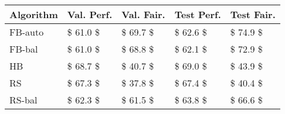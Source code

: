 \begin{tabular}{lllll}
\toprule
Algorithm & Val. Perf. & Val. Fair. & Test Perf. & Test Fair. \\
\midrule
  FB-auto &   \$ 61.0 \$ &   \$ 69.7 \$ &   \$ 62.6 \$ &   \$ 74.9 \$ \\
   FB-bal &   \$ 61.0 \$ &   \$ 68.8 \$ &   \$ 62.1 \$ &   \$ 72.9 \$ \\
       HB &   \$ 68.7 \$ &   \$ 40.7 \$ &   \$ 69.0 \$ &   \$ 43.9 \$ \\
       RS &   \$ 67.3 \$ &   \$ 37.8 \$ &   \$ 67.4 \$ &   \$ 40.4 \$ \\
   RS-bal &   \$ 62.3 \$ &   \$ 61.5 \$ &   \$ 63.8 \$ &   \$ 66.6 \$ \\
\bottomrule
\end{tabular}
